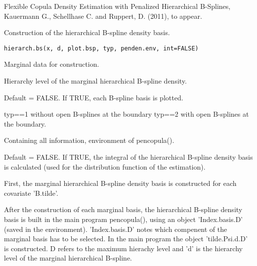 \documentclass[a4paper]{book}
\begin{document}
%
\begin{References}\relax
Flexible Copula Density Estimation with Penalized
Hierarchical B-Splines, Kauermann G., Schellhase C. and Ruppert, D. (2011), to appear.
\end{References}
%
\begin{Description}\relax
Construction of the hierarchical B-spline density basis.
\end{Description}
%
\begin{Usage}
\begin{verbatim}
hierarch.bs(x, d, plot.bsp, typ, penden.env, int=FALSE)
\end{verbatim}
\end{Usage}
%
\begin{Arguments}
\begin{ldescription}
\item[\code{x}] Marginal data for construction.
\item[\code{d}] Hierarchy level of the marginal hierarchical B-spline density.
\item[\code{plot.bsp}] Default = FALSE. If TRUE, each B-spline basis is plotted.
\item[\code{typ}] typ==1 without open B-splines at the boundary
typ==2 with open B-splines at the boundary.
\item[\code{penden.env}] Containing all information, environment of pencopula().
\item[\code{int}] Default = FALSE. If TRUE, the integral of the hierarchical
B-spline density basis is calculated (used for the distribution
function of the estimation).
\end{ldescription}
\end{Arguments}
%
\begin{Details}\relax
First, the marginal hierarchical B-spline density basis is constructed for each
covariate 'B.tilde'.

After the construction of each marginal basis, the
hierarchical B-spline density basis is built in the main program
pencopula(), using an object  'Index.basis.D' (saved in the
environment). 'Index.basis.D' notes which compenent of the marginal
basis has to be selected. In the main program the object
'tilde.Psi.d.D' is constructed. D refers to the maximum hierachy level
and 'd' is the hierarchy level of the marginal hierarchical B-spline.
\end{Details}
\end{document}
